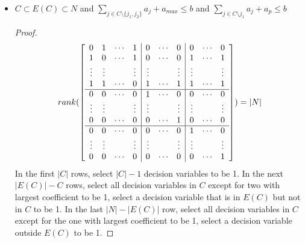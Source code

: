\begin{itemize}
                    \item $C \subset E(C) \subset N$ and $\sum_{j\in C \setminus \{j_1, j_2\}} a_j + a_{max} \le b$ and $\sum_{j\in C \setminus j_1} a_j + a_p \le b$
                        \begin{proof}
                            \begin{equation*}
                                rank(\left[\begin{array}{c c c c | c c c | c c c}
                                    0 & 1 & \cdots & 1 & 0 & \cdots & 0 & 0 & \cdots & 0 \\
                                    1 & 0 & \cdots & 1 & 0 & \cdots & 0 & 1 & \cdots & 1 \\
                                    \vdots & \vdots & & \vdots & \vdots & & \vdots & \vdots & & \vdots \\
                                    1 & 1 & \cdots & 0 & 1 & \cdots & 1 & 1 & \cdots & 1\\
                                    \hline
                                    0 & 0 & \cdots & 0 & 1 & \cdots & 0 & 0 & \cdots & 0\\
                                    \vdots & \vdots & & \vdots & \vdots & & \vdots & \vdots & & \vdots \\
                                    0 & 0 & \cdots & 0 & 0 & \cdots & 1 & 0 & \cdots & 0 \\
                                    \hline
                                    0 & 0 & \cdots & 0 & 0 & \cdots & 0 & 1 & \cdots & 0 \\
                                    \vdots & \vdots & & \vdots & \vdots & & \vdots & \vdots & & \vdots \\
                                    0 & 0 & \cdots & 0 & 0 & \cdots & 0 & 0 & \cdots & 1 \\
                                    \end{array}\right]) = |N|
                            \end{equation*}
                            In the first $|C|$ rows, select $|C| - 1$ decision variables to be 1. In the next $|E(C)| - C$ rows, select all decision variables in $C$ except for two with largest coefficient to be 1, select a decision variable that is in $E(C)$ but not in $C$ to be 1. In the last $|N| - |E(C)|$ row, select all decision variables in $C$ except for the one with largest coefficient to be 1, select a decision variable outside $E(C)$ to be 1.
                        \end{proof}
                \end{itemize}

